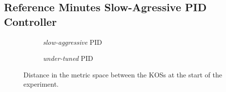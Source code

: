 \newpage
\FloatBarrier
\subsection{Reference Minutes Slow-Agressive PID Controller}
\begin{figure}[!h]
    \begin{subfigure}[t]{0.48\linewidth}
        \centering
        
        \vspace*{-2em}
        \caption{\emph{slow-aggressive} PID}
        \label{fig:ref-slow-over}
    \end{subfigure}
    \hfill
    \begin{subfigure}[t]{0.48\linewidth}
        \centering
        
        \vspace*{-2em}
        \caption{\emph{under-tuned} PID}
        \label{fig:ref-soft}
    \end{subfigure}
    \caption{Distance in the metric space between the KOSs at the start of the experiment.}
\end{figure}

\begin{table}[h]
    \centering
    \caption{Numerical values of the reference minute metrics for the \emph{slow-aggressive} PID experiment.}
    \label{tab:ref-slow-over}
    \vspace*{-1em}
    \begin{subtable}{\linewidth}
        \centering\vspace*{1em}
        \caption{Baseline controller}
        
    \end{subtable}
    \begin{subtable}[t]{\linewidth}
        \centering
        \vspace*{1em}
        \caption{(Disabled) target adapter}
        
    \end{subtable}
\end{table}

\FloatBarrier
